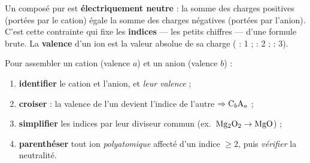\documentclass[11pt,a4paper]{article}
\begin{document}

\begin{cle}
Un composé pur est \textbf{électriquement neutre} : la somme des charges positives (portées par le cation)
égale la somme des charges négatives (portées par l'anion). C'est cette contrainte qui fixe les
\textbf{indices} — les petits chiffres — d'une formule brute. La \textbf{valence} d'un ion est la valeur
absolue de sa charge ( : 1 ;  : 2 ;  : 3).
\end{cle}

\begin{methode}
Pour assembler un cation  (valence $a$) et un anion  (valence $b$) :
\begin{enumerate}[label=\arabic*.,leftmargin=2.0em,topsep=2pt,itemsep=1pt]
  \item \textbf{identifier} le cation et l'anion, et \emph{leur valence} ;
  \item \textbf{croiser} : la valence de l'un devient l'indice de l'autre $\Rightarrow \ce{C_bA_a}$ ;
  \item \textbf{simplifier} les indices par leur diviseur commun (ex.\ $\ce{Mg2O2}\to\ce{MgO}$) ;
  \item \textbf{parenthéser} tout ion \emph{polyatomique} affecté d'un indice $\geq 2$, puis \emph{vérifier}
        la neutralité.
\end{enumerate}
\end{methode}

\begin{center}
\end{center}
\end{document}
